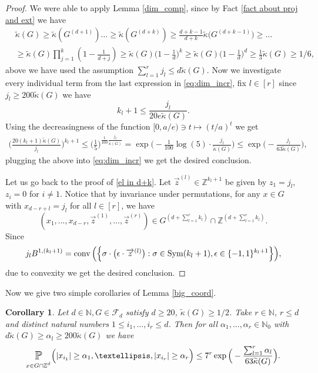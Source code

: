 \documentclass[10pt,a4paper]{amsart}
\numberwithin{equation}{section}
\newtheorem{Cor}[Thm]{Corollary}
\newcommand{\Pro}{\mathop{\mathbb{P}}}
\newcommand{\Z}{\mathbb{Z}}
\newcommand{\N}{\mathbb{N}}
\DeclareMathOperator{\Sym}{Sym}
\DeclareMathOperator{\conv}{conv}
\newcommand{\spr}[1]{\underset{_{\substack{#1}}}{\mathlarger{\mathlarger{\Pro}}}}
\begin{document}
\begin{proof}
We were able to apply Lemma \ref{dim_comp}, since by Fact \ref{fact about proj and ext} we have
\begin{align*}
&\widetilde{\kappa}(G) \ge \widetilde{\kappa}(G^{(d+1)}) \ldots \ge\widetilde{\kappa}(G^{(d+k)}) \ge \frac{d+k-1}{d+k} \widetilde{\kappa}\big(G^{(d+k-1)}\big) \ge \ldots \\
& \ge \widetilde{\kappa}(G) \prod_{j=1}^k(1-\frac{1}{d+j}) 
\ge \widetilde{\kappa}(G) \Big(1- \frac{1}{d} \Big)^k \ge \widetilde{\kappa}(G) \Big(1- \frac{1}{d} \Big)^d \ge \frac{1}{3} \widetilde{\kappa}(G) \ge 1/6,
\end{align*}
above we have used the assumption $\sum_{l=1}^r j_l \le d \widetilde{\kappa}(G)$.
Now we investigate every individual term from the last expression in \eqref{eq:dim_incr}, fix $l \in [r]$
since $j_l \ge 200 \widetilde{\kappa}(G)$ we have
\[
k_l+1 \le \frac{j_l}{20e \widetilde{\kappa}(G)}.
\]
Using the decreasingness of the function $[0, a/e) \ni t \mapsto (t/a)^t$ we get
\begin{align*}
    \Big( \frac{20(k_l+1) \widetilde{\kappa}(G)}{j_l} \Big)^{k_l+1} \le \Big( \frac{1}{5} \Big)^{\frac{1}{100} \frac{j_l}{\widetilde{\kappa}(G)}}= \exp \Big( - \frac{1}{100} \log(5) \cdot \frac{j_l}{\widetilde{\kappa}(G)} \Big) \le \exp \Big( -  \frac{j_l}{63\widetilde{\kappa}(G)} \Big),
\end{align*}
plugging the above into \eqref{eq:dim_incr} we get the desired conclusion. 
\par Let us go back to the proof of \eqref{el in d+k}.
Let $\overrightarrow{z}^{(l)} \in \Z^{k_l+1}$ be given by $z_1=j_l$, $z_i=0$ for $i \neq 1$. Notice that by invariance under permutations, for any $x \in G$ with $x_{d-r+l}=j_l$ for all $l \in [r]$, we have
\[
(x_1,...,x_{d-r},\overrightarrow{z}^{(1)}, \ldots, \overrightarrow{z}^{(r)}) \in G^{(d+\sum_{l=1}^r k_l)} \cap \Z^{(d+\sum_{l=1}^r k_l)}.
\]
Since 
\[
j_lB^{1,(k_l+1)}= \conv \Big( \Big\{ \sigma \cdot \big(\epsilon \cdot\overrightarrow{z}^{(l)} \big):\sigma \in \Sym(k_l+1), \\ \epsilon \in \{-1,1\}^{k_l+1}\Big\}\Big),
\]
due to convexity we get the desired conclusion.
\end{proof}
Now we give two simple corollaries of Lemma \ref{big_coord}.
\begin{Cor} \label{big_coord tail bound}
   Let $d \in \N, G \in \mathcal{F}_d$ satisfy $d \ge 20$, $\widetilde{\kappa}(G) \ge 1/2$. Take $r \in \N$, $r \le d$ and distinct natural numbers $1 \le i_1,...,i_r \le d$. Then for all $\alpha_1,...,\alpha_r \in \N_0$ with $d\widetilde{\kappa}(G) \ge \alpha_l \ge 200 \widetilde{\kappa}(G)$ we have
    \[
    \spr{x \in G \cap \Z^d} \Big( |x_{i_1}|\ge \alpha_1, \ldots,|x_{i_r}| \ge \alpha_r \Big) \le  7^{r}\exp\Big(- \frac{\sum_{l=1}^r\alpha_l}{63\widetilde{\kappa}(G)} \Big) .
    \]  
\end{Cor}
\end{document}
